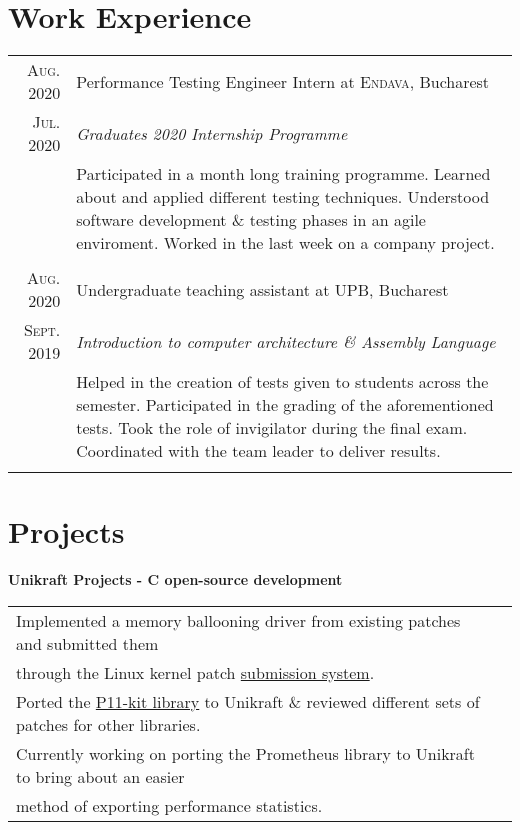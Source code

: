 \documentclass[a4paper,10pt]{article}
\begin{document}
\section{Work Experience}
	\begin{tabular}{r|p{11cm}}
	
		 \textsc{Aug. 2020} & Performance Testing Engineer Intern at \textsc{Endava}, Bucharest \\
		\textsc{Jul. 2020}&\emph{Graduates 2020 Internship Programme}\\&
		\footnotesize{Participated in a month long training programme. Learned about and applied different testing techniques.
			Understood software development \& testing phases in an agile enviroment. Worked in the last week on a company project.}
		\\\multicolumn{2}{c}{} \\
		
		\textsc{Aug. 2020} & Undergraduate teaching assistant at \textsc{UPB}, Bucharest \\
		\textsc{Sept. 2019}&\emph{Introduction to computer architecture \& Assembly Language}\\&
		\footnotesize{Helped in the creation of tests given to students across the semester. Participated in the grading of the aforementioned tests.
			Took the role of invigilator during the final exam. Coordinated with the team leader to deliver results.}
		\\\multicolumn{2}{c}{} \\
	
	\end{tabular}

\section{Projects}
	\begin{flushleft}
		\textbf{Unikraft Projects - C open-source development}
	\end{flushleft}
	\begin{tabular}{ll}
		\textbullet\enspace\enspace Implemented a memory ballooning driver from existing patches and submitted them
				\\\enspace\enspace\enspace  through the Linux kernel patch \href{https://patchwork.unikraft.org/project/unikraft/list/?series=1532}{submission system}.\\
		\textbullet\enspace\enspace Ported the \href{https://github.com/cs-pub-ro/unikraft-p11-kit}{P11-kit library} to Unikraft \& reviewed different sets of patches for other libraries.\\
		\textbullet\enspace\enspace Currently working on porting the Prometheus library to Unikraft to bring about an easier
				\\\enspace\enspace\enspace method of exporting performance statistics.\\
	\end{tabular}
\end{document}

